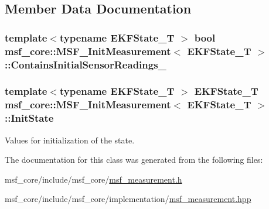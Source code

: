 \subsection{Member Data Documentation}
\hypertarget{classmsf__core_1_1MSF__InitMeasurement_a8dfcbfdee2b01e6afd0a2160b613acfa}{
\subsubsection[{Contains\-Initial\-Sensor\-Readings\-\_\-}]{\setlength{\rightskip}{0pt plus 5cm}template$<$typename E\-K\-F\-State\-\_\-\-T $>$ bool {\bf msf\-\_\-core\-::\-M\-S\-F\-\_\-\-Init\-Measurement}$<$ E\-K\-F\-State\-\_\-\-T $>$\-::Contains\-Initial\-Sensor\-Readings\-\_\-\hspace{0.3cm}{\ttfamily [private]}}}\label{classmsf__core_1_1MSF__InitMeasurement_a8dfcbfdee2b01e6afd0a2160b613acfa}
\hypertarget{classmsf__core_1_1MSF__InitMeasurement_a3eec8952562e2632f9c6f1b23ee49aec}{
\subsubsection[{Init\-State}]{\setlength{\rightskip}{0pt plus 5cm}template$<$typename E\-K\-F\-State\-\_\-\-T $>$ E\-K\-F\-State\-\_\-\-T {\bf msf\-\_\-core\-::\-M\-S\-F\-\_\-\-Init\-Measurement}$<$ E\-K\-F\-State\-\_\-\-T $>$\-::Init\-State\hspace{0.3cm}{\ttfamily [private]}}}\label{classmsf__core_1_1MSF__InitMeasurement_a3eec8952562e2632f9c6f1b23ee49aec}
Values for initialization of the state. 

The documentation for this class was generated from the following files\-:\begin{DoxyCompactItemize}
\item 
msf\-\_\-core/include/msf\-\_\-core/\hyperlink{msf__measurement_8h}{msf\-\_\-measurement.\-h}\item 
msf\-\_\-core/include/msf\-\_\-core/implementation/\hyperlink{msf__measurement_8hpp}{msf\-\_\-measurement.\-hpp}\end{DoxyCompactItemize}

